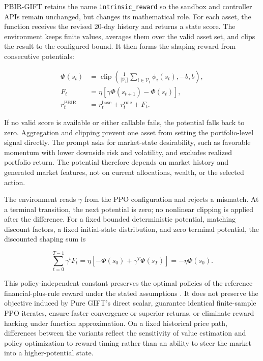 \documentclass[pdflatex,sn-basic,Numbered]{sn-jnl}
\begin{document}
PBIR-GIFT retains the name \texttt{intrinsic\_reward} so the sandbox and controller APIs remain unchanged, but changes its mathematical role. For each asset, the function receives the revised 20-day history and returns a state score. The environment keeps finite values, averages them over the valid asset set, and clips the result to the configured bound. It then forms the shaping reward from consecutive potentials:

\[
\begin{aligned}
\Phi(s_t)&=\operatorname{clip}\!\left(
\frac{1}{|\mathcal V_t|}\sum_{i\in\mathcal V_t}\phi_i(s_t),-b,b\right),\\
F_t&=\eta\left[\gamma\Phi(s_{t+1})-\Phi(s_t)\right],\\
r_t^{\mathrm{PBIR}}&=r_t^{\mathrm{base}}+r_t^{\mathrm{rule}}+F_t.
\end{aligned}
\]

If no valid score is available or either callable fails, the potential falls back to zero. Aggregation and clipping prevent one asset from setting the portfolio-level signal directly. The prompt asks for market-state desirability, such as favorable momentum with lower downside risk and volatility, and excludes realized portfolio return. The potential therefore depends on market history and generated market features, not on current allocations, wealth, or the selected action.

The environment reads \(\gamma\) from the PPO configuration and rejects a mismatch. At a terminal transition, the next potential is zero; no nonlinear clipping is applied after the difference. For a fixed bounded deterministic potential, matching discount factors, a fixed initial-state distribution, and zero terminal potential, the discounted shaping sum is

\[
\sum_{t=0}^{T-1}\gamma^tF_t
=\eta\left[-\Phi(s_0)+\gamma^T\Phi(s_T)\right]
=-\eta\Phi(s_0).
\]

This policy-independent constant preserves the optimal policies of the reference financial-plus-rule reward under the stated assumptions \cite{ref30}. It does not preserve the objective induced by Pure GIFT's direct scalar, guarantee identical finite-sample PPO iterates, ensure faster convergence or superior returns, or eliminate reward hacking under function approximation. On a fixed historical price path, differences between the variants reflect the sensitivity of value estimation and policy optimization to reward timing rather than an ability to steer the market into a higher-potential state.
\end{document}
